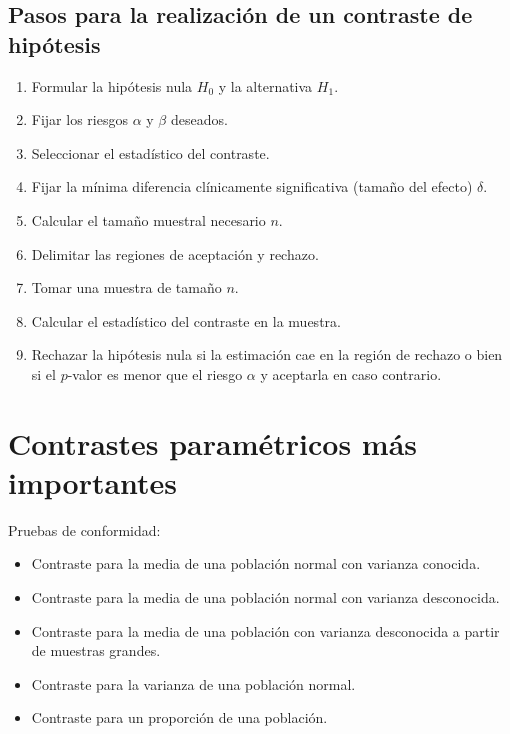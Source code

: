 \documentclass[
  a4paper,
]{scrreport}
\providecommand{\tightlist}{%
  \setlength{\itemsep}{0pt}\setlength{\parskip}{0pt}}\usepackage{longtable,booktabs,array}
\theoremstyle{plain}
\theoremstyle{definition}
\theoremstyle{definition}
\theoremstyle{remark}
\begin{document}
\subsection{Pasos para la realización de un contraste de
hipótesis}\label{pasos-para-la-realizaciuxf3n-de-un-contraste-de-hipuxf3tesis}

\begin{enumerate}
\def\labelenumi{\arabic{enumi}.}
\tightlist
\item
  Formular la hipótesis nula \(H_0\) y la alternativa \(H_1\).
\item
  Fijar los riesgos \(\alpha\) y \(\beta\) deseados.
\item
  Seleccionar el estadístico del contraste.
\item
  Fijar la mínima diferencia clínicamente significativa (tamaño del
  efecto) \(\delta\).
\item
  Calcular el tamaño muestral necesario \(n\).
\item
  Delimitar las regiones de aceptación y rechazo.
\item
  Tomar una muestra de tamaño \(n\).
\item
  Calcular el estadístico del contraste en la muestra.
\item
  Rechazar la hipótesis nula si la estimación cae en la región de
  rechazo o bien si el \(p\)-valor es menor que el riesgo \(\alpha\) y
  aceptarla en caso contrario.
\end{enumerate}

\section{Contrastes paramétricos más
importantes}\label{contrastes-paramuxe9tricos-muxe1s-importantes}

Pruebas de conformidad:

\begin{itemize}
\tightlist
\item
  Contraste para la media de una población normal con varianza conocida.
\item
  Contraste para la media de una población normal con varianza
  desconocida.
\item
  Contraste para la media de una población con varianza desconocida a
  partir de muestras grandes.
\item
  Contraste para la varianza de una población normal.
\item
  Contraste para un proporción de una población.
\end{itemize}
\end{document}
